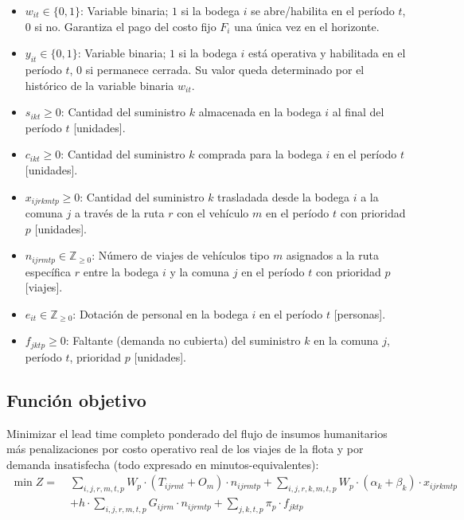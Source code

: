 \documentclass[letterpaper]{article}
\begin{document}
\begin{flushleft}
\begin{itemize}[leftmargin=2em, itemsep=1pt]
  \item $w_{it} \in \{0,1\}$: Variable binaria; $1$ si la bodega $i$ se abre/habilita en el per\'iodo $t$, $0$ si no. Garantiza el pago del costo fijo $F_i$ una \'unica vez en el horizonte.
  \item $y_{it} \in \{0,1\}$: Variable binaria; $1$ si la bodega $i$ est\'a operativa y habilitada en el per\'iodo $t$, $0$ si permanece cerrada. Su valor queda determinado por el hist\'orico de la variable binaria $w_{it}$.
  \item $s_{ikt} \geq 0$: Cantidad del suministro $k$ almacenada en la bodega $i$ al final del per\'iodo $t$ [unidades].
  \item $c_{ikt} \geq 0$: Cantidad del suministro $k$ comprada para la bodega $i$ en el per\'iodo $t$ [unidades].
  \item $x_{ijrkmtp} \geq 0$: Cantidad del suministro $k$ trasladada desde la bodega $i$ a la comuna $j$ a trav\'es de la ruta $r$ con el veh\'iculo $m$ en el per\'iodo $t$ con prioridad $p$ [unidades].
  \item $n_{ijrmtp} \in \mathbb{Z}_{\geq 0}$: N\'umero de viajes de veh\'iculos tipo $m$ asignados a la ruta espec\'ifica $r$ entre la bodega $i$ y la comuna $j$ en el per\'iodo $t$ con prioridad $p$ [viajes].
  \item $e_{it} \in \mathbb{Z}_{\geq 0}$: Dotaci\'on de personal en la bodega $i$ en el per\'iodo $t$ [personas].
  \item $f_{jktp} \geq 0$: Faltante (demanda no cubierta) del suministro $k$ en la comuna $j$, per\'iodo $t$, prioridad $p$ [unidades].
\end{itemize}

\subsection{Funci\'on objetivo}

Minimizar el lead time completo ponderado del flujo de insumos humanitarios m\'as penalizaciones por costo operativo real de los viajes de la flota y por demanda insatisfecha (todo expresado en minutos-equivalentes):
\begin{equation}
\begin{aligned}
\min Z = \;& \sum_{i,j,r,m,t,p} W_p \cdot (T_{ijrmt} + O_m) \cdot n_{ijrmtp}
           + \sum_{i,j,r,k,m,t,p} W_p \cdot (\alpha_k + \beta_k) \cdot x_{ijrkmtp} \\
          & + h \cdot \sum_{i,j,r,m,t,p} G_{ijrm} \cdot n_{ijrmtp}
           + \sum_{j,k,t,p} \pi_p \cdot f_{jktp}
\end{aligned}
\end{equation}


\end{flushleft}
\end{document}
